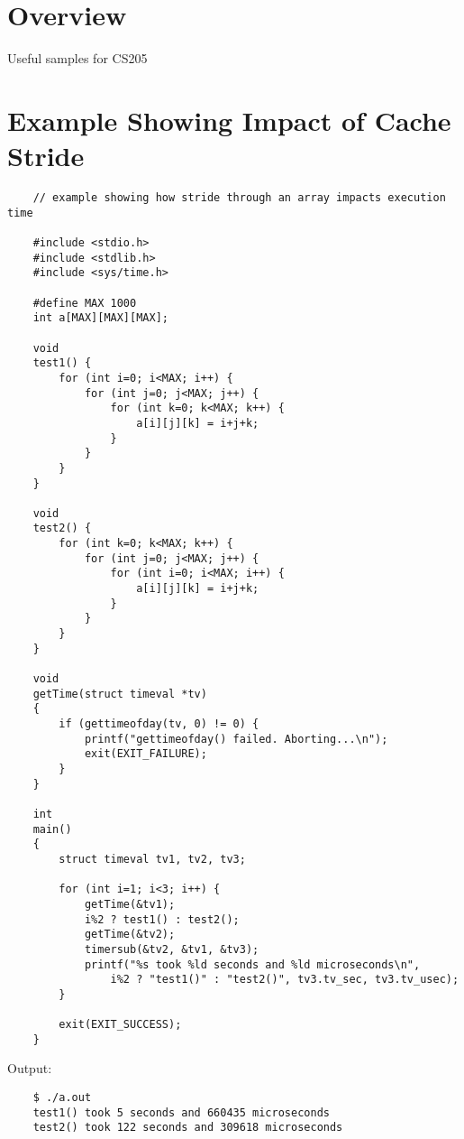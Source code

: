 \documentclass[12pt,letterpaper]{article}
\begin{document}
    \section*{Overview}

    Useful samples for CS205

    \setcounter{tocdepth}{1}
    \tableofcontents
    \clearpage

    \section{Example Showing Impact of Cache Stride}\label{stride}

    \begin{verbatim}
    // example showing how stride through an array impacts execution time
    
    #include <stdio.h>
    #include <stdlib.h>
    #include <sys/time.h>
    
    #define MAX 1000
    int a[MAX][MAX][MAX];
    
    void
    test1() {
        for (int i=0; i<MAX; i++) {
            for (int j=0; j<MAX; j++) {
                for (int k=0; k<MAX; k++) {
                    a[i][j][k] = i+j+k;
                }
            }
        }
    }
    
    void
    test2() {
        for (int k=0; k<MAX; k++) {
            for (int j=0; j<MAX; j++) {
                for (int i=0; i<MAX; i++) {
                    a[i][j][k] = i+j+k;
                }
            }
        }
    }
    
    void
    getTime(struct timeval *tv)
    {
        if (gettimeofday(tv, 0) != 0) {
            printf("gettimeofday() failed. Aborting...\n");
            exit(EXIT_FAILURE);
        }
    }
    
    int
    main() 
    {
        struct timeval tv1, tv2, tv3;
        
        for (int i=1; i<3; i++) {
            getTime(&tv1);
            i%2 ? test1() : test2();
            getTime(&tv2);
            timersub(&tv2, &tv1, &tv3);
            printf("%s took %ld seconds and %ld microseconds\n",
                i%2 ? "test1()" : "test2()", tv3.tv_sec, tv3.tv_usec);
        }
        
        exit(EXIT_SUCCESS);
    }
    \end{verbatim}


    \noindent Output:
    \begin{verbatim}
    $ ./a.out
    test1() took 5 seconds and 660435 microseconds
    test2() took 122 seconds and 309618 microseconds
    \end{verbatim}
\end{document}
